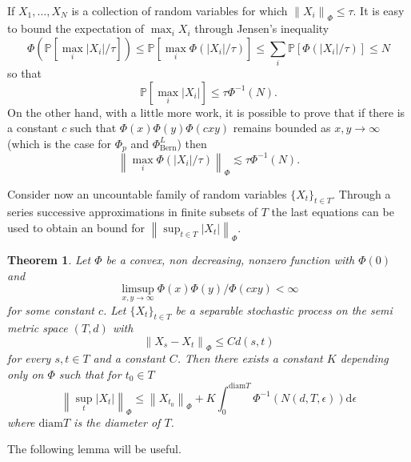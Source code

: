\documentclass{uvamath}
\newcommand*{\bbP}{\mathbb{P}}
\newcommand*{\norm}[1]{\left\lVert#1\right\rVert}
\newcommand*{\rmd}{\mathrm{d}}
\newtheorem{theorem}{Theorem}[section]
\theoremstyle{remark}
\theoremstyle{definition}
\theoremstyle{definition}
\theoremstyle{definition}
\theoremstyle{definition}
\theoremstyle{definition}
\begin{document}
\begin{appendices}
If $X_1,\dots,X_N$ is a collection of random variables for which
$\norm{X_i}_{\Phi}\leq \tau$. It is easy to bound the expectation of
$\max_{i}X_i$ through Jensen's inequality
\begin{equation*}
  \Phi(\bbP[\max_{i}|X_i|/ \tau]) \leq \bbP[\max_{i}\Phi(|X_i| / \tau)]\leq
  \sum_i \bbP[\Phi(|X_i| / \tau)] \leq N
\end{equation*}
so that
\begin{equation*}
  \bbP[\max_{i}|X_i|] \leq \tau \Phi^{-1}(N).
\end{equation*}
On the other hand, with a little more work, it is possible to prove
that if there is a constant $c$ such that $\Phi(x)\Phi(y)\Phi(cxy)$
remains bounded as $x,y\to\infty$ (which is the case for $\Phi_p$ and
$\Phi_{\text{Bern}}^L$) then
\begin{equation*}
  \norm{\max_{i}\Phi(|X_i| / \tau)}_{\Phi}\lesssim \tau\Phi^{-1}(N).
\end{equation*}

Consider now an uncountable family of random variables
$\{X_t\}_{t\in T}$. Through a series successive approximations in
finite subsets of $T$ the last equations can be used to obtain an
bound for $\norm{\sup_{t\in T}|X_t|}_{\Phi}$.
\begin{theorem}\label{thm:chaining}
  Let $\Phi$ be a convex, non decreasing, nonzero function with
  $\Phi(0)$ and
  $$\limsup_{x,y\to\infty}\Phi(x)\Phi(y)/\Phi(cxy)<\infty$$ for some
  constant $c$. Let $\{X_t\}_{t\in T}$ be a separable stochastic
  process on the semi metric space $(T,d)$ with
  \begin{equation*}
    \norm{X_s - X_t}_{\Phi}\leq Cd(s,t)
  \end{equation*}
  for every $s,t\in T$ and a constant
  $C$. Then there exists a constant $K$ depending only on $\Phi$ such
  that for $t_0\in T$
  \begin{equation*}
    \norm{\sup_t|X_t|}_{\Phi} \leq \norm{X_{t_0}}_{\Phi} +
    K\int_{0}^{\mathrm{diam} T}\Phi^{-1}(N(d, T, \epsilon)) \rmd \epsilon
  \end{equation*}
  where $\mathrm{diam}T$ is the diameter of $T$.
\end{theorem}

The following lemma will be useful.


\end{appendices}
\end{document}

